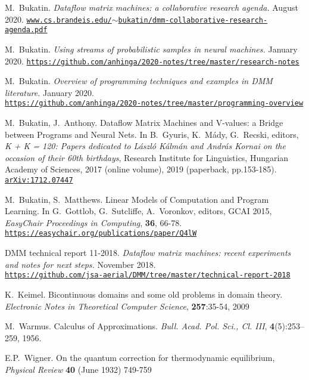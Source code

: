 \documentclass{article}
\begin{document}
\begin{thebibliography}{1}

 M.~Bukatin.
{\em Dataflow matrix machines: a collaborative research agenda.} August 2020.
\href{https://www.cs.brandeis.edu/~bukatin/dmm-collaborative-research-agenda.pdf}{\tt\footnotesize www.cs.brandeis.edu/$\sim$bukatin/dmm-collaborative-research-agenda.pdf}

 M.~Bukatin.
{\em Using streams of probabilistic samples in neural machines.} January 2020.
\href{https://github.com/anhinga/2020-notes/tree/master/research-notes}{\tt\footnotesize https://github.com/anhinga/2020-notes/tree/master/research-notes}

 M.~Bukatin.
{\em Overview of programming techniques and examples in DMM literature.} January 2020.\\
\href{https://github.com/anhinga/2020-notes/tree/master/programming-overview}
{\tt\footnotesize https://github.com/anhinga/2020-notes/tree/master/programming-overview}

 M.~Bukatin, J.~Anthony.
Dataflow Matrix Machines and V-values: a Bridge between Programs and Neural Nets. 
In B.~Gyuris, K.~M\'ady, G.~Recski, editors, {\em K + K = 120: Papers dedicated to L\'aszl\'o K\'alm\'an and Andr\'as Kornai on the occasion of their 60th birthdays}, Research Institute for Linguistics, Hungarian Academy of Sciences, 2017 (online volume), 2019 (paperback, pp.153-185).
\href{https://arxiv.org/abs/1712.07447}{\tt\footnotesize arXiv:1712.07447}

 M.~Bukatin, S.~Matthews.
Linear Models of Computation and Program Learning. In G.~Gottlob, G.~Sutcliffe, A.~Voronkov, editors,
GCAI 2015, {\em EasyChair Proceedings in Computing}, {\bf 36}, 66-78.
\href{https://easychair.org/publications/paper/Q4lW}{\tt\footnotesize https://easychair.org/publications/paper/Q4lW}

 DMM technical report 11-2018.
{\em Dataflow matrix machines: recent experiments and notes for next steps.} November 2018.\\
\href{https://github.com/jsa-aerial/DMM/tree/master/technical-report-2018}
{\tt\footnotesize https://github.com/jsa-aerial/DMM/tree/master/technical-report-2018}



K.~Keimel.  Bicontinuous domains and some old problems in domain theory. {\em Electronic Notes in Theoretical Computer Science}, {\bf 257}:35-54, 2009

M.~Warmus. Calculus of Approximations. {\em Bull. Acad. Pol. Sci., Cl. III}, {\bf 4}(5):253--259, 1956.

E.P.~Wigner. On the quantum correction for thermodynamic equilibrium, {\em Physical Review} {\bf 40} (June 1932) 749-759

\end{thebibliography}
\end{document}
